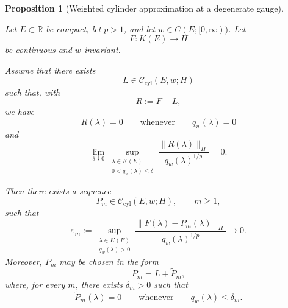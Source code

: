 \documentclass[a4paper,10pt]{article}
\newtheorem{prop}[thm]{Proposition}
\begin{document}
\begin{prop}[Weighted cylinder approximation at a degenerate gauge]
\label{prop:weighted-gauge-cylinder-approximation}

Let \(E\subset\mathbb R\) be compact, let \(p>1\), and let
\(w\in C(E;[0,\infty))\). Let
\[
        F:K(E)\longrightarrow H
\]
be continuous and \(w\)-invariant.

Assume that there exists
\[
        L\in\mathcal C_{\mathrm{cyl}}(E,w;H)
\]
such that, with
\[
        R:=F-L,
\]
we have
\[
        R(\lambda)=0
        \qquad\text{whenever}\qquad
        q_w(\lambda)=0
\]
and
\[
\lim_{\delta\downarrow0}
\sup_{\substack{\lambda\in K(E)\\
                 0<q_w(\lambda)\le\delta}}
\frac{\lVert R(\lambda)\rVert_H}
     {q_w(\lambda)^{1/p}}
=
0.
\]

Then there exists a sequence
\[
        P_m\in\mathcal C_{\mathrm{cyl}}(E,w;H),
        \qquad m\ge1,
\]
such that
\[
        \varepsilon_m
        :=
        \sup_{\substack{\lambda\in K(E)\\q_w(\lambda)>0}}
        \frac{\lVert F(\lambda)-P_m(\lambda)\rVert_H}
             {q_w(\lambda)^{1/p}}
        \longrightarrow0.
\]
Moreover, \(P_m\) may be chosen in the form
\[
        P_m=L+\widetilde P_m,
\]
where, for every \(m\), there exists \(\delta_m>0\) such that
\[
        \widetilde P_m(\lambda)=0
        \qquad\text{whenever}\qquad
        q_w(\lambda)\le\delta_m.
\]
\end{prop}
\end{document}
